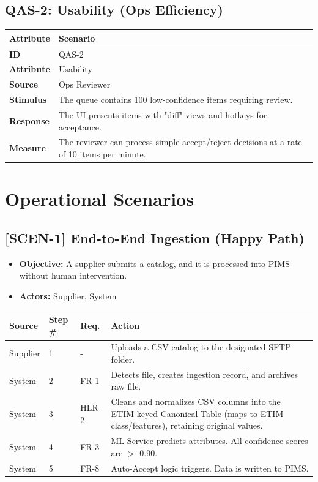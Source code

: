 \documentclass[12pt, a4paper]{article}
\begin{document}
\subsection*{QAS-2: Usability (Ops Efficiency)}
\begin{longtable}{@{}lp{12cm}@{}}
\toprule
\textbf{Attribute} & \textbf{Scenario} \\
\midrule
\textbf{ID} & QAS-2 \\
\textbf{Attribute} & Usability \\
\textbf{Source} & Ops Reviewer \\
\textbf{Stimulus} & The queue contains 100 low-confidence items requiring review. \\
\textbf{Response} & The UI presents items with "diff" views and hotkeys for acceptance. \\
\textbf{Measure} & The reviewer can process simple accept/reject decisions at a rate of 10 items per minute. \\
\bottomrule
\end{longtable}

\newpage
\section{Operational Scenarios}

\subsection*{[SCEN-1] End-to-End Ingestion (Happy Path)}
\begin{itemize}
    \item \textbf{Objective:} A supplier submits a catalog, and it is processed into PIMS without human intervention.
    \item \textbf{Actors:} Supplier, System
\end{itemize}

\begin{longtable}{@{}llp{2cm}p{8cm}@{}}
\toprule
\textbf{Source} & \textbf{Step \#} & \textbf{Req.} & \textbf{Action} \\
\midrule
Supplier & 1 & - & Uploads a CSV catalog to the designated SFTP folder. \\
System & 2 & FR-1 & Detects file, creates ingestion record, and archives raw file. \\
System & 3 & HLR-2 & Cleans and normalizes CSV columns into the ETIM-keyed Canonical Table (maps to ETIM class/features), retaining original values. \\
System & 4 & FR-3 & ML Service predicts attributes. All confidence scores are $>$ 0.90. \\
System & 5 & FR-8 & Auto-Accept logic triggers. Data is written to PIMS. \\
\bottomrule
\end{longtable}
\end{document}
